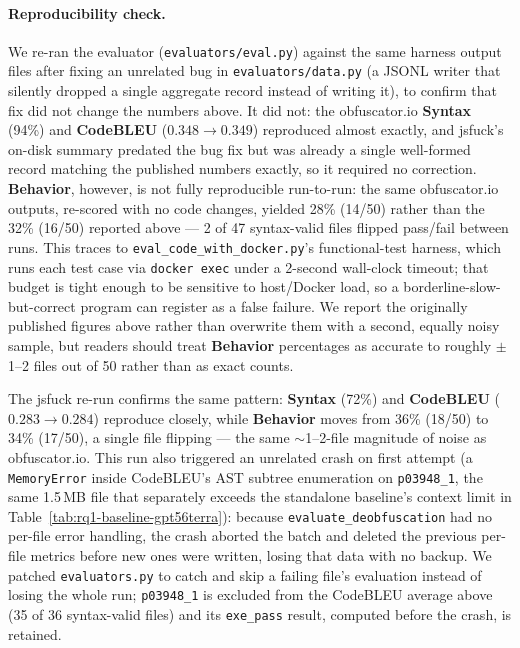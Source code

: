 \paragraph{Reproducibility check.} We re-ran the evaluator
(\texttt{evaluators/eval.py}) against the same harness output files after
fixing an unrelated bug in \texttt{evaluators/data.py} (a JSONL writer that
silently dropped a single aggregate record instead of writing it), to
confirm that fix did not change the numbers above. It did not: the
obfuscator.io \textbf{Syntax} (94\%) and \textbf{CodeBLEU} ($0.348\to0.349$)
reproduced almost exactly, and jsfuck's on-disk summary predated the bug fix
but was already a single well-formed record matching the published numbers
exactly, so it required no correction. \textbf{Behavior}, however, is not
fully reproducible run-to-run: the same obfuscator.io outputs, re-scored
with no code changes, yielded 28\% (14/50) rather than the 32\% (16/50)
reported above --- 2 of 47 syntax-valid files flipped pass/fail between
runs. This traces to \texttt{eval\_code\_with\_docker.py}'s functional-test
harness, which runs each test case via \texttt{docker exec} under a
2-second wall-clock timeout; that budget is tight enough to be sensitive to
host/Docker load, so a borderline-slow-but-correct program can register as
a false failure. We report the originally published figures above rather
than overwrite them with a second, equally noisy sample, but readers should
treat \textbf{Behavior} percentages as accurate to roughly $\pm$1--2 files
out of 50 rather than as exact counts.

The jsfuck re-run confirms the same pattern: \textbf{Syntax} (72\%) and
\textbf{CodeBLEU} ($0.283\to0.284$) reproduce closely, while
\textbf{Behavior} moves from 36\% (18/50) to 34\% (17/50), a single file
flipping --- the same $\sim$1--2-file magnitude of noise as
obfuscator.io. This run also triggered an unrelated crash on first attempt
(a \texttt{MemoryError} inside CodeBLEU's AST subtree enumeration on
\texttt{p03948\_1}, the same 1.5\,MB file that separately exceeds the
standalone baseline's context limit in Table~\ref{tab:rq1-baseline-gpt56terra}):
because \texttt{evaluate\_deobfuscation} had no per-file error handling,
the crash aborted the batch and deleted the previous per-file metrics
before new ones were written, losing that data with no backup. We patched
\texttt{evaluators.py} to catch and skip a failing file's evaluation
instead of losing the whole run; \texttt{p03948\_1} is excluded from the
CodeBLEU average above (35 of 36 syntax-valid files) and its
\texttt{exe\_pass} result, computed before the crash, is retained.
